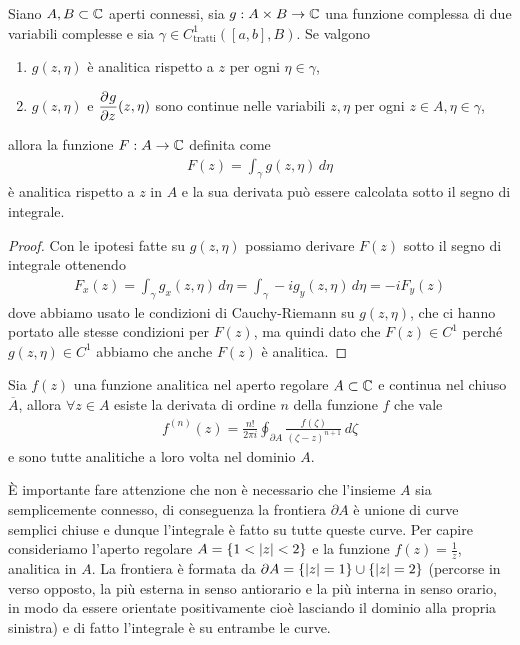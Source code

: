 \begin{theorem} \label{thm: integrali dipendenti da un parametro}
  Siano $ A,B \subset \mathbb{C} $ aperti connessi, sia $ g: A\times B \to \mathbb{C} $ una funzione complessa di due variabili complesse e sia 
  $ \gamma \in C^1_{\text{tratti}}([a,b], B) $. Se valgono
  \begin{enumerate}
    \item $ g(z,\eta) $ è analitica rispetto a $ z $ per ogni $ \eta \in \gamma $,
    \item $ g(z,\eta ) $ e $ \displaystyle \frac{\partial^{} {g}}{\partial {z}^{}}(z,\eta) $ sono continue nelle variabili $ z,\eta $ per ogni $ z\in A, \eta \in \gamma $,
  \end{enumerate} 
  allora la funzione $ F: A \to \mathbb{C} $ definita come 
  \begin{align}
    F(z) = \int_\gamma g(z, \eta) \, d\eta
  \end{align}
  è analitica rispetto a $ z $ in $ A $ e la sua derivata può essere calcolata sotto il segno di integrale.
\end{theorem}
\begin{proof}
  Con le ipotesi fatte su $ g(z,\eta) $ possiamo derivare $ F(z) $ sotto il segno di integrale ottenendo
  \begin{align}
    F_x(z) = \int_\gamma g_x(z,\eta)\,d\eta = \int_\gamma - i g_y(z,\eta)\,d\eta = -i F_y(z)
  \end{align}
  dove abbiamo usato le condizioni di Cauchy-Riemann su $ g(z,\eta) $, che ci hanno portato alle stesse condizioni per $ F(z) $, ma quindi dato che 
  $ F(z) \in C^1 $ perché $ g(z,\eta) \in C^1 $ abbiamo che anche $ F(z) $ è analitica.
\end{proof}

\begin{theorem} \label{thm: derivata n-esima di funzioni analitiche}
  Sia $ f(z) $ una funzione analitica nel aperto regolare $ A \subset \mathbb{C} $ e continua nel chiuso $ \overline{A} $, allora $ \forall z \in A $ esiste la 
  derivata di ordine $ n $ della funzione $ f $ che vale
  \begin{align}
    f^{(n)}(z) = \frac{n!}{2\pi i} \oint_{\partial A} \frac{f(\zeta)}{(\zeta - z)^{n + 1}} \, d\zeta
  \end{align}
  e sono tutte analitiche a loro volta nel dominio $ A $.
\end{theorem}

È importante fare attenzione che non è necessario che l'insieme $ A $ sia semplicemente connesso, di conseguenza la frontiera $ \partial A $ è unione 
di curve semplici chiuse e dunque l'integrale è fatto su tutte queste curve. Per capire consideriamo l'aperto regolare 
$ A = \{ 1 < \left|{z}\right| < 2\} $ e la funzione $ f(z) = \frac1z $, analitica in $ A $. La frontiera è formata da 
$ \partial A = \{\left|{z}\right| = 1 \} \cup \{\left|{z}\right| = 2 \} $ (percorse in verso opposto, la più esterna in senso antiorario e la più interna in senso orario, 
in modo da essere orientate positivamente cioè lasciando il dominio alla propria sinistra) e di fatto l'integrale è su entrambe le curve.

